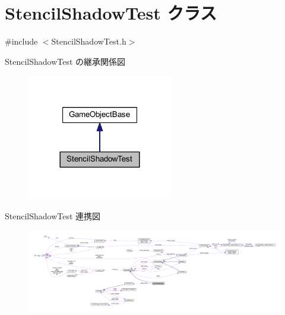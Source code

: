 \hypertarget{class_stencil_shadow_test}{}\section{Stencil\+Shadow\+Test クラス}
\label{class_stencil_shadow_test}


{\ttfamily \#include $<$Stencil\+Shadow\+Test.\+h$>$}



Stencil\+Shadow\+Test の継承関係図\nopagebreak
\begin{figure}[H]
\begin{center}
\leavevmode
\includegraphics[width=180pt]{class_stencil_shadow_test__inherit__graph}
\end{center}
\end{figure}


Stencil\+Shadow\+Test 連携図
\nopagebreak
\begin{figure}[H]
\begin{center}
\leavevmode
\includegraphics[width=350pt]{class_stencil_shadow_test__coll__graph}
\end{center}
\end{figure}

